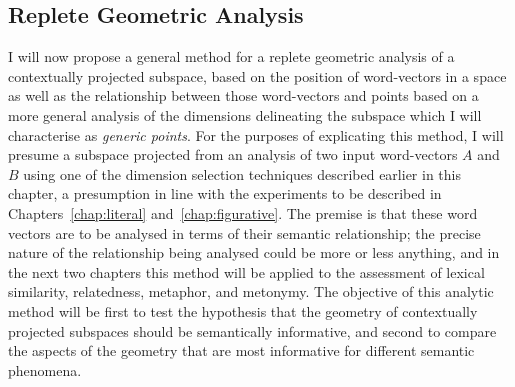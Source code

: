 \subsection{Replete Geometric Analysis} \label{chap:replete}
I will now propose a general method for a replete geometric analysis of a contextually projected subspace, based on the position of word-vectors in a space as well as the relationship between those word-vectors and points based on a more general analysis of the dimensions delineating the subspace which I will characterise as \emph{generic points}.  For the purposes of explicating this method, I will presume a subspace projected from an analysis of two input word-vectors $A$ and $B$ using one of the dimension selection techniques described earlier in this chapter, a presumption in line with the experiments to be described in Chapters~\ref{chap:literal} and~\ref{chap:figurative}.  The premise is that these word vectors are to be analysed in terms of their semantic relationship; the precise nature of the relationship being analysed could be more or less anything, and in the next two chapters this method will be applied to the assessment of lexical similarity, relatedness, metaphor, and metonymy.  The objective of this analytic method will be first to test the hypothesis that the geometry of contextually projected subspaces should be semantically informative, and second to compare the aspects of the geometry that are most informative for different semantic phenomena.


